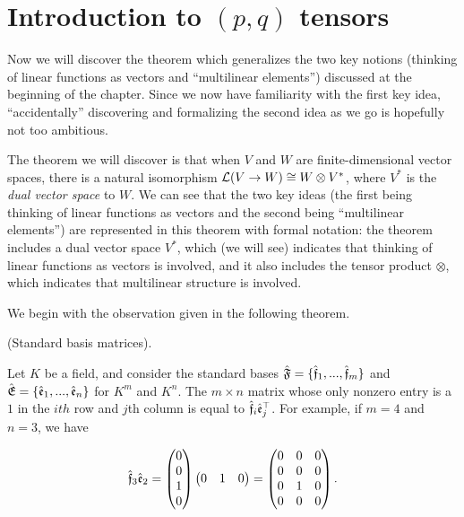 \newpage

\section{Introduction to $(p, q)$ tensors}
\label{ch::motivated_intro::sec::motivated_intro}

Now we will discover the theorem which generalizes the two key notions (thinking of linear functions as vectors and ``multilinear elements'') discussed at the beginning of the chapter. Since we now have familiarity with the first key idea, ``accidentally'' discovering and formalizing the second idea as we go is hopefully not too ambitious.

The theorem we will discover is that when $V$ and $W$ are finite-dimensional vector spaces, there is a natural isomorphism $\mathcal{L}(V \rightarrow W) \cong W \otimes V^*$, where $V^*$ is the \textit{dual vector space} to $W$. We can see that the two key ideas (the first being thinking of linear functions as vectors and the second being ``multilinear elements'') are represented in this theorem with formal notation: the theorem includes a dual vector space $V^*$, which (we will see) indicates that thinking of linear functions as vectors is involved, and it also includes the tensor product $\otimes$, which indicates that multilinear structure is involved.

We begin with the observation given in the following theorem.

\begin{lemma}
    (Standard basis matrices).

    Let $K$ be a field, and consider the standard bases ${\hat{\mathfrak{F}}} = \{ \hat{\mathfrak{f}}_1, ..., \hat{\mathfrak{f}}_m\}$ and ${\hat{\mathfrak{E}}} = \{\hat{\mathfrak{e}}_1, ..., \hat{\mathfrak{e}}_n\}$ for $K^m$ and $K^n$. The $m \times n$ matrix whose only nonzero entry is a $1$ in the $ith$ row and $j$th column is equal to $\hat{\mathfrak{f}}_i \hat{\mathfrak{e}}_j^\top$. For example, if $m = 4$ and $n = 3$, we have

    \begin{align*}
        \hat{\mathfrak{f}}_3 \hat{\mathfrak{e}}_2 = 
        \begin{pmatrix}
            0 \\
            0 \\
            1 \\
            0
        \end{pmatrix}
        \begin{pmatrix}
            0 & 1 & 0
        \end{pmatrix}
        =
        \begin{pmatrix}
            0 & 0 & 0 \\
            0 & 0 & 0 \\
            0 & 1 & 0 \\
            0 & 0 & 0
        \end{pmatrix}.
    \end{align*}
\end{lemma}


